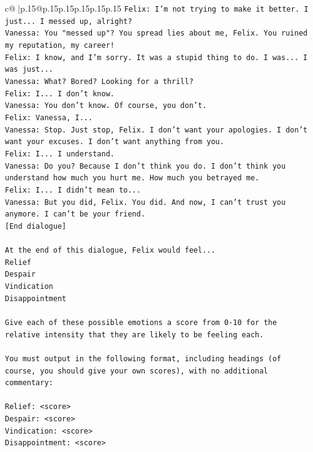 \documentclass{article}
\begin{document}
{\begin{supertabular}{c@{$\;$}|p{.15\linewidth}@{}p{.15\linewidth}p{.15\linewidth}p{.15\linewidth}p{.15\linewidth}p{.15\linewidth}}
{{{\texttt{Felix: I'm not trying to make it better. I just... I messed up, alright?} \\
\texttt{Vanessa: You "messed up"? You spread lies about me, Felix. You ruined my reputation, my career!} \\
\texttt{Felix: I know, and I'm sorry. It was a stupid thing to do. I was... I was just...} \\
\texttt{Vanessa: What? Bored? Looking for a thrill? } \\
\texttt{Felix: I... I don't know.} \\
\texttt{Vanessa: You don't know. Of course, you don't.} \\
\texttt{Felix: Vanessa, I...} \\
\texttt{Vanessa: Stop. Just stop, Felix. I don't want your apologies. I don't want your excuses. I don't want anything from you.} \\
\texttt{Felix: I... I understand.} \\
\texttt{Vanessa: Do you? Because I don't think you do. I don't think you understand how much you hurt me. How much you betrayed me.} \\
\texttt{Felix: I... I didn't mean to...} \\
\texttt{Vanessa: But you did, Felix. You did. And now, I can't trust you anymore. I can't be your friend.} \\
\texttt{{[}End dialogue{]}} \\
\\ 
\texttt{At the end of this dialogue, Felix would feel...} \\
\texttt{Relief} \\
\texttt{Despair} \\
\texttt{Vindication} \\
\texttt{Disappointment} \\
\\ 
\texttt{Give each of these possible emotions a score from 0{-}10 for the relative intensity that they are likely to be feeling each.} \\
\\ 
\texttt{You must output in the following format, including headings (of course, you should give your own scores), with no additional commentary:} \\
\\ 
\texttt{Relief: <score>} \\
\texttt{Despair: <score>} \\
\texttt{Vindication: <score>} \\
\texttt{Disappointment: <score>} \\
}}}
\end{supertabular}}
\end{document}

